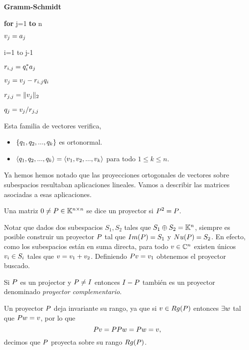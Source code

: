 \begin{center}
\begin{tcolorbox}[width=\linewidth/3]
\begin{center}
{\bf Gramm-Schmidt}
\end{center}


{\bf for} j=1 {\bf to} n

\qquad $\vb_j=\ab_j$

 i=1 to j-1

\qquad\qquad $r_{i,j}=\qb_i^*\ab_j$

\qquad\qquad  $\vb_j=\vb_j-r_{i.j}
\qb_i$


\qquad$r_{j,j}=\|\vb_j\|_2$

\qquad$\qb_{j}=\vb_j/r_{j,j}$

\end{tcolorbox}
\end{center}
Esta familia de vectores verifica,
\begin{itemize}
 \item $\{\qb_1,\qb_2,...,\qb_k\}$ es ortonormal.
 \item $\langle\qb_1,\qb_2,...,\qb_k\rangle=\langle\vb_1,\vb_2,..., \vb_k\rangle$ para todo $1\le k\le n$.
\end{itemize}

Ya hemos hemos notado que las proyecciones ortogonales de vectores sobre subespacios  resultaban aplicaciones lineales.  Vamos a describir las matrices asociadas a esas aplicaciones.
\tccdefi
\begin{defi}
Una matriz $\cero \neq \Pb\in \Knn$ se dice un proyector si
$\Pb^2=\Pb$.
\end{defi}
\etcc

Notar que  dados dos subespacios $S_1,S_2$ tales que $S_1\oplus S_2=\mathbb K^{n}$, siempre es posible construir un proyector $\Pb$ tal que $Im(\Pb)=S_1$ y $Nu(\Pb)=S_2$. En efecto, como los subespacios están en suma directa, para todo $\vb\in \Cn$ existen únicos $\vb_i\in S_i$ tales que
$\vb=\vb_1+\vb_2$. Definiendo $\Pb\vb=\vb_1$ obtenemos el proyector buscado.

Si $\Pb$ es un projector y $\Pb\neq \Ib$ entonces $\Ib-\Pb$ también es un proyector denominado \emph{proyector complementario}.

Un proyector $\Pb$ deja invariante su rango, ya que si $\vb\in Rg(\Pb)$ entonces $\exists \wb$ tal que  $\Pb\wb=\vb$, por lo que
$$
\Pb\vb=\Pb\Pb\wb=\Pb\wb=\vb,
$$
decimos que $\Pb$ proyecta sobre su rango $Rg(\Pb)$.


